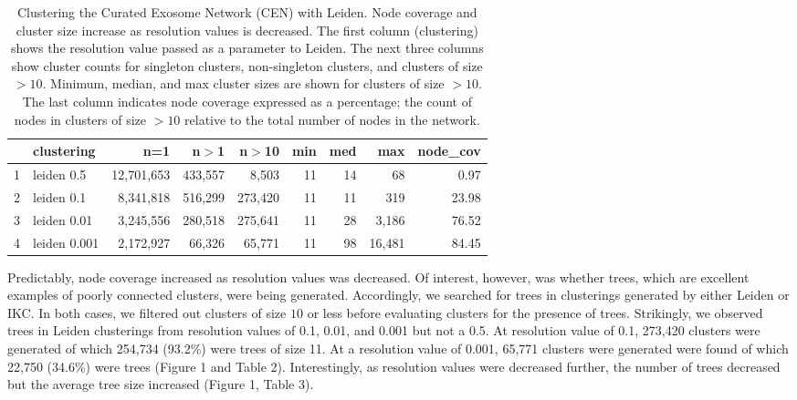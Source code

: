 \documentclass[12pt, oneside]{article}   	%
\begin{document}
\begin{table}[ht]
\centering
\begin{tabular}{rlrrrrrrr}
  \hline
 & clustering & n=1 & n$>$1 & n$>$10 & min & med & max & node\_cov \\ 
  \hline
1 & leiden 0.5 & 12,701,653 & 433,557 & 8,503 & 11 & 14 & 68 & 0.97 \\ 
  2 & leiden 0.1 & 8,341,818 & 516,299 & 273,420 & 11 & 11 & 319 & 23.98 \\ 
  3 & leiden 0.01 & 3,245,556 & 280,518 & 275,641 & 11 & 28 & 3,186 & 76.52 \\ 
  4 & leiden 0.001 & 2,172,927 & 66,326 & 65,771 & 11 & 98 & 16,481 & 84.45 \\ 
   \hline
\end{tabular}
\caption{Clustering the Curated Exosome Network (CEN) with Leiden. Node coverage and cluster size increase as resolution values is decreased. The first column (clustering) shows the resolution value passed as a parameter to Leiden. The next three columns show cluster counts for singleton clusters, non-singleton clusters, and clusters of size $>10$. Minimum, median, and max cluster sizes are shown for clusters of size $>10$. The last column indicates node coverage expressed as a percentage; the count of nodes in clusters of size $>10$ relative to the total number of nodes in the network. }
\label{tab: table1}
\end{table}

Predictably, node coverage increased as resolution values was decreased. Of interest, however, was whether trees, which are excellent examples of poorly connected clusters, were being generated. Accordingly, we searched for trees in clusterings generated by either Leiden or IKC. In both cases, we filtered out clusters of size $10$ or less before evaluating clusters for the presence of trees. Strikingly, we observed trees in Leiden clusterings from resolution values of 0.1, 0.01, and 0.001 but not a 0.5. At resolution value of 0.1, 273,420 clusters were generated of which 254,734 (93.2\%) were trees of size 11. At a resolution value of 0.001, 65,771 clusters were generated were found of which 22,750 (34.6\%) were trees (Figure 1 and Table 2). Interestingly, as resolution values were decreased further, the number of trees decreased but the average tree size increased (Figure 1, Table 3). 
\end{document}
